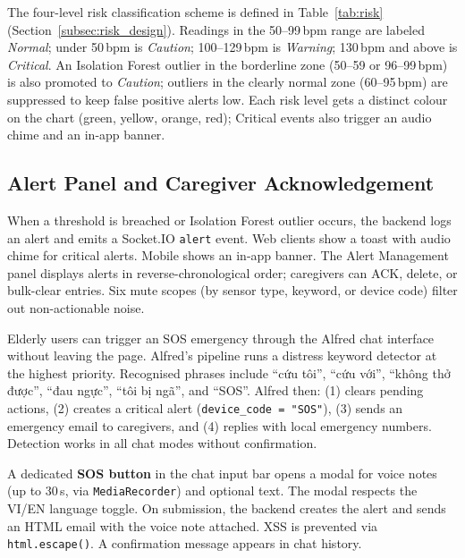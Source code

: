 The four-level risk classification scheme is defined in Table~\ref{tab:risk} (Section~\ref{subsec:risk_design}). Readings in the 50--99\,bpm range are labeled \textit{Normal}; under 50\,bpm is \textit{Caution}; 100--129\,bpm is \textit{Warning}; 130\,bpm and above is \textit{Critical}. An Isolation Forest outlier in the borderline zone (50--59 or 96--99\,bpm) is also promoted to \textit{Caution}; outliers in the clearly normal zone (60--95\,bpm) are suppressed to keep false positive alerts low. Each risk level gets a distinct colour on the chart (green, yellow, orange, red); Critical events also trigger an audio chime and an in-app banner.

\subsection{Alert Panel and Caregiver Acknowledgement}

When a threshold is breached or Isolation Forest outlier occurs, the backend logs an alert and emits a Socket.IO \texttt{alert} event. Web clients show a toast with audio chime for critical alerts. Mobile shows an in-app banner. The Alert Management panel displays alerts in reverse-chronological order; caregivers can ACK, delete, or bulk-clear entries. Six mute scopes (by sensor type, keyword, or device code) filter out non-actionable noise.

Elderly users can trigger an SOS emergency through the Alfred chat interface without leaving the page. Alfred's pipeline runs a distress keyword detector at the highest priority. Recognised phrases include ``cứu tôi'', ``cứu với'', ``không thở được'', ``đau ngực'', ``tôi bị ngã'', and ``SOS''. Alfred then: (1) clears pending actions, (2) creates a critical alert (\texttt{device\_code = "SOS"}), (3) sends an emergency email to caregivers, and (4) replies with local emergency numbers. Detection works in all chat modes without confirmation.

A dedicated \textbf{SOS button} in the chat input bar opens a modal for voice notes (up to 30\,s, via \texttt{MediaRecorder}) and optional text. The modal respects the VI/EN language toggle. On submission, the backend creates the alert and sends an HTML email with the voice note attached. XSS is prevented via \texttt{html.escape()}. A confirmation message appears in chat history.









